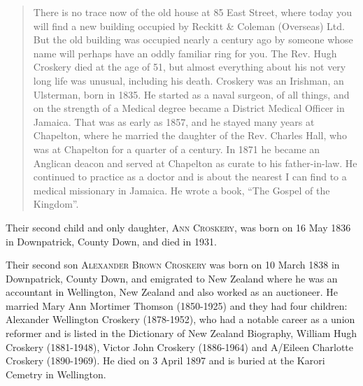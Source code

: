 \begin{quotation}
There is no trace now of the old house at 85 East Street, where today you will find a new building occupied by Reckitt \& Coleman (Overseas) Ltd.  But the old building was occupied nearly a century ago by someone whose name will perhaps  
have an oddly familiar ring for you. The Rev. Hugh Croskery died at the age of 51, but almost everything about his not very long life was unusual, including his death. Croskery was an Irishman, an Ulsterman, born in 1835.  He started as a naval surgeon, of all things, and on the strength of a Medical degree became a District Medical Officer in Jamaica. That was as early as 1857, and he stayed many years at Chapelton, where he married the daughter of the Rev. Charles Hall, who was at Chapelton for a quarter of a century. In 1871 he became an Anglican deacon and served at Chapelton as curate to his father-in-law.  He continued to practice as a doctor and is about the nearest I can find to a medical missionary in Jamaica. He wrote a book, ``The Gospel of the Kingdom''.
 \end{quotation}
    
Their second child and only daughter, \textsc{Ann Croskery}, was born on 16 May 1836 in Downpatrick, County Down, and died in 1931. 

Their second son \textsc{Alexander Brown Croskery} was born on 10 March 1838 in	Downpatrick, County Down, and emigrated to New Zealand where he was an accountant in Wellington, New Zealand and also worked as an auctioneer.  He married Mary Ann Mortimer Thomson (1850-1925) and they had four children: Alexander Wellington Croskery (1878-1952), who had a notable career as a union reformer and is listed in the Dictionary of New Zealand Biography,  William Hugh Croskery (1881-1948), Victor John Croskery (1886-1964) and A/Eileen Charlotte Croskery (1890-1969). He died on 3 April 1897 and is buried at the Karori Cemetry in Wellington.

